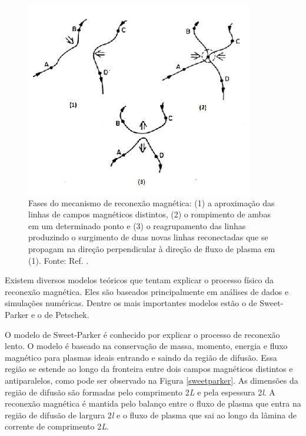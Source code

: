 \begin{figure} [ht]
	\begin{center}
		\includegraphics[scale=0.65]{reconexao.jpg}
		\caption{Fases do mecanismo de reconexão magnética: (1) a aproximação das linhas de campos magnéticos distintos, (2) o rompimento de ambas em um determinado ponto e (3) o reagrupamento das linhas produzindo o surgimento de duas novas linhas reconectadas que se propagam na direção perpendicular à direção de fluxo de plasma em (1). Fonte: Ref. \cite{lakhina1992}.}
		\label{reconexao}
	\end{center}
\end{figure} 

Existem diversos modelos teóricos que tentam explicar o processo físico da reconexão magnética. Eles são baseados principalmente em análises de dados e simulações numéricas. Dentre os mais importantes modelos estão o de Sweet-Parker e o de Petschek.

O modelo de Sweet-Parker é conhecido por explicar o processo de reconexão lento. O modelo é baseado na conservação de massa, momento, energia e fluxo magnético para plasmas ideais entrando e saindo da região de difusão. Essa região se estende ao longo da fronteira entre dois campos magnéticos distintos e antiparalelos, como pode ser observado na Figura \ref{sweetparker}. As dimensões da região de difusão são formadas pelo comprimento 2\textit{L} e pela espessura 2\textit{l}. A reconexão magnética é mantida pelo balanço entre o fluxo de plasma que entra na região de difusão de largura 2\textit{l} e o fluxo de plasma que sai ao longo da lâmina de corrente de comprimento 2\textit{L}\cite{treumann}.

